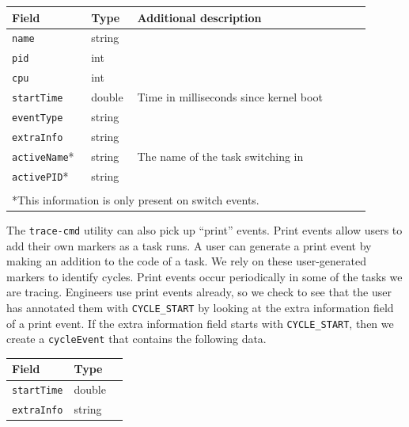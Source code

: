 \documentclass{hmcclinic}
\begin{document}
  \begin{center}
    \begin{tabular}{p{0.2\linewidth}p{0.1\linewidth}p{0.6\linewidth}}
      \toprule
      Field     & Type   & Additional description                 \\
      \midrule
       \texttt{name}      & string &                                        \\
       \texttt{pid}       & int    &                                        \\
       \texttt{cpu}       & int    &                                        \\
       \texttt{startTime} & double & Time in milliseconds since kernel boot \\
       \texttt{eventType} & string &                                        \\
      \texttt{extraInfo} & string &                                        \\
       \texttt{activeName}* & string & The name of the task switching in      \\
       \texttt{activePID}*  & string &                                        \\
      \bottomrule\\
\multicolumn{3}{l}{ *This information is only present on switch events.}
    \end{tabular}
  \end{center}

 

  The \texttt{trace-cmd} utility can also pick up ``print'' events. Print events allow users to add
  their own markers as a task runs. A user can generate a print event by making
  an addition to the code of a task. We rely on these user-generated markers to
  identify cycles. Print events occur periodically in some of the tasks we are
  tracing. Engineers use print events already, so we check to see
  that the user has annotated them with \texttt{CYCLE\_START} by looking at the extra
  information field of a print event. If the extra information field starts with
  \texttt{CYCLE\_START}, then we create a \texttt{cycleEvent} that contains the following data.

  \begin{center}
    \begin{tabular}{lll}
      \toprule
      Field     & Type                \\
      \midrule
       \texttt{startTime}      & double                               \\
       \texttt{extraInfo}       & string                              \\
      \bottomrule
    \end{tabular}
  \end{center}
\end{document}
